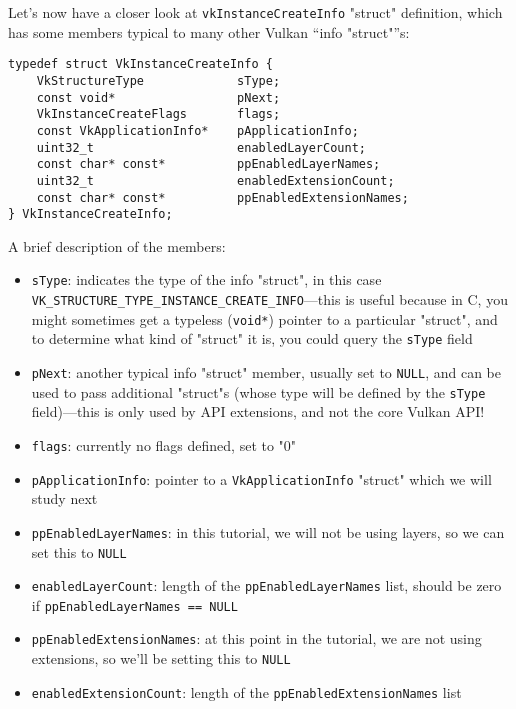 \documentclass[12pt,letterpaper]{article}
\newcommand{\inquotes}[1]{``#1''}	%
\newcommand{\cil}[1]{\texttt{#1}}
\begin{document}
	Let's now have a closer look at \cil{vkInstanceCreateInfo} "struct" definition, which has some members typical to many other Vulkan \inquotes{info "struct"}s:
		\begin{verbatim}
typedef struct VkInstanceCreateInfo {
	VkStructureType             sType;
	const void*                 pNext;
	VkInstanceCreateFlags       flags;
	const VkApplicationInfo*    pApplicationInfo;
	uint32_t                    enabledLayerCount;
	const char* const*          ppEnabledLayerNames;
	uint32_t                    enabledExtensionCount;
	const char* const*          ppEnabledExtensionNames;
} VkInstanceCreateInfo;
		\end{verbatim}
	A brief description of the members:
		\begin{itemize}
			\item \cil{sType}: indicates the type of the info "struct", in this case \cil{VK_STRUCTURE_TYPE_INSTANCE_CREATE_INFO}---this is useful because in C, you might sometimes get a typeless (\cil{void*}) pointer to a particular "struct", and to determine what kind of "struct" it is, you could query the \cil{sType} field
			
			\item \cil{pNext}: another typical info "struct" member, usually set to \cil{NULL}, and can be used to pass additional "struct"s (whose type will be defined by the \cil{sType} field)---this is only used by API extensions, and not the core Vulkan API!
			
			\item \cil{flags}: currently no flags defined, set to "0"
			
			\item \cil{pApplicationInfo}: pointer to a \cil{VkApplicationInfo} "struct" which we will study next
			
			\item \cil{ppEnabledLayerNames}: in this tutorial, we will not be using layers, so we can set this to \cil{NULL}
			
			\item \cil{enabledLayerCount}: length of the \cil{ppEnabledLayerNames} list, should be zero if \cil{ppEnabledLayerNames == NULL}
			
			\item \cil{ppEnabledExtensionNames}: at this point in the tutorial, we are not using extensions, so we'll be setting this to \cil{NULL}
			
			\item \cil{enabledExtensionCount}: length of the \cil{ppEnabledExtensionNames} list
		\end{itemize}
\end{document}
